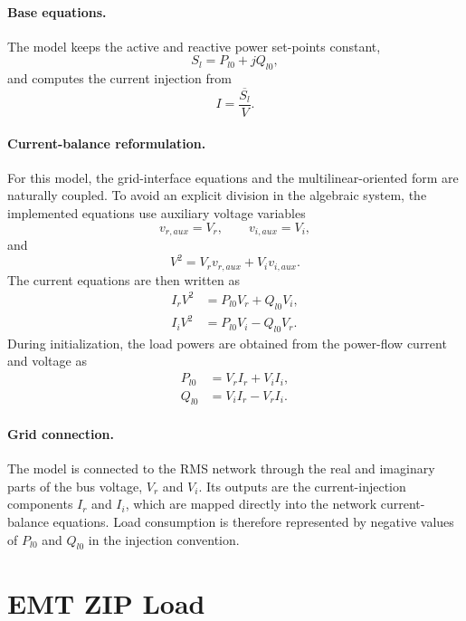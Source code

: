 \paragraph{Base equations.}
The model keeps the active and reactive power set-points constant,
\begin{equation}
    S_l = P_{l0} + j Q_{l0},
\end{equation}
and computes the current injection from
\begin{equation}
    I = \overline{\frac{S_l}{V}}.
\end{equation}

\paragraph{Current-balance reformulation.}
For this model, the grid-interface equations and the multilinear-oriented form are naturally coupled. To avoid an explicit division in the algebraic system, the implemented equations use auxiliary voltage variables
\begin{equation}
    v_{r,aux}=V_r, \qquad v_{i,aux}=V_i,
\end{equation}
and
\begin{equation}
    V^2 = V_r v_{r,aux} + V_i v_{i,aux}.
\end{equation}
The current equations are then written as
\begin{align}
    I_r V^2 &= P_{l0} V_r + Q_{l0} V_i, \\
    I_i V^2 &= P_{l0} V_i - Q_{l0} V_r.
\end{align}
During initialization, the load powers are obtained from the power-flow current and voltage as
\begin{align}
    P_{l0} &= V_r I_r + V_i I_i, \\
    Q_{l0} &= V_i I_r - V_r I_i.
\end{align}

\paragraph{Grid connection.}
The model is connected to the RMS network through the real and imaginary parts of the bus voltage, $V_r$ and $V_i$. Its outputs are the current-injection components $I_r$ and $I_i$, which are mapped directly into the network current-balance equations. Load consumption is therefore represented by negative values of $P_{l0}$ and $Q_{l0}$ in the injection convention.

\section{EMT ZIP Load}

